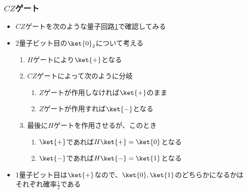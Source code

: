 \begin{frame}
  \frametitle{$CZ$ゲート}

  \begin{itemize}
    \item $CZ$ゲートを次のような量子回路\ref{fig:cz_gate}で確認してみる
    \begin{figure}
      \centering
      \label{fig:cz_gate}
    \end{figure}
    
    \item 2量子ビット目の$\ket{0}_2$について考える
    \begin{enumerate}
      \item $H$ゲートにより$\ket{+}$となる

      \item $CZ$ゲートによって次のように分岐
      \begin{enumerate}
        \item $Z$ゲートが作用しなければ$\ket{+}$のまま
        \item $Z$ゲートが作用すれば$\ket{-}$となる
      \end{enumerate}

      \item 最後に$H$ゲートを作用させるが、このとき
      \begin{enumerate}
        \item $\ket{+}$であれば$H\ket{+} = \ket{0}$となる
        \item $\ket{-}$であれば$H\ket{-} = \ket{1}$となる
      \end{enumerate}
    \end{enumerate}

    \item 1量子ビット目は$\ket{+}$なので、$\ket{0}, \ket{1}$のどちらかになるかは
    それぞれ確率$\frac{1}{2}$である
  \end{itemize}
\end{frame}

